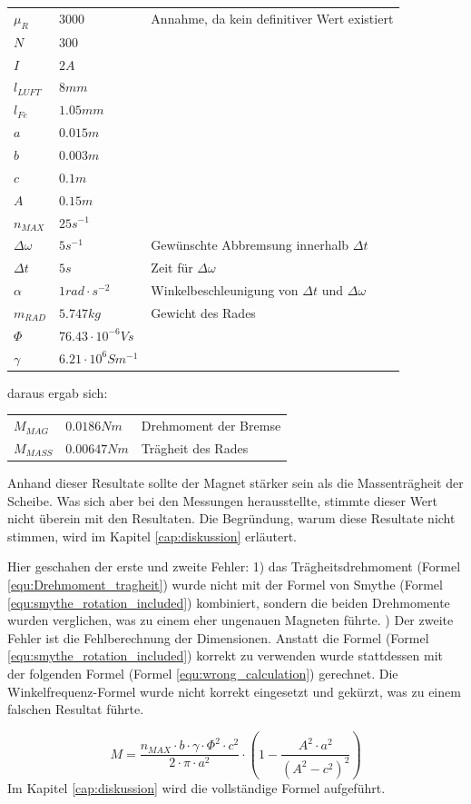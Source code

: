 \begin{tabularx}{0.9\textwidth}{lll}
$\mu_R$	       & $3000$		&Annahme, da kein definitiver Wert existiert\\
$N$	           & $300$		\\
$I$	           & $2 A$\\
$l_{LUFT}$	   & $8 mm$\\
$l_{Fe}$ 	     & $1.05 mm$\\
$a$	           & $0.015 m$\\
$b$	           & $0.003 m$\\
$c$	           & $0.1 m$\\
$A$	           & $0.15 m$\\
$n_{MAX}$	     & $25 s^{-1}$	\\
$\Delta\omega$ & $5 s^{-1}$	  &	Gewünschte Abbremsung innerhalb $\Delta t$\\
$\Delta t$	   & $5 s$        &	Zeit für $\Delta\omega$\\
$\alpha$	     & $1 rad\cdot s^{-2}$&	Winkelbeschleunigung von $\Delta t$ und $\Delta\omega$\\
$m_{RAD}$	     & $5.747 kg$	  & Gewicht des Rades\\
$\Phi$	       & $76.43\cdot 10^{-6} Vs$\\
$\gamma$	     & $6.21\cdot 10^{6} Sm^{-1}$
\end{tabularx}\nonumber
\newpara
daraus ergab sich:
\newpara
\begin{tabularx}{0.9\textwidth}{lll}
  $M_{MAG}$	   & $0.0186 Nm$		& Drehmoment der Bremse\\
  $M_{MASS}$   & $0.00647 Nm$		& Trägheit des Rades\\
\end{tabularx}\nonumber
\newpara
Anhand dieser Resultate sollte der Magnet stärker sein als die Massenträgheit der Scheibe. Was sich aber bei den Messungen herausstellte, stimmte dieser Wert nicht überein mit den Resultaten. Die Begründung, warum diese Resultate nicht stimmen, wird im Kapitel \ref{cap:diskussion} erläutert.
\newpara
\begin{tcolorbox}
  Hier geschahen der erste und zweite Fehler: 1) das Trägheitsdrehmoment (Formel \ref{equ:Drehmoment_tragheit}) wurde nicht mit der Formel von Smythe (Formel \ref{equ:smythe_rotation_included}) kombiniert, sondern die beiden Drehmomente wurden verglichen, was zu einem eher ungenauen Magneten führte. 
  ) Der zweite Fehler ist die Fehlberechnung der Dimensionen. Anstatt die Formel (Formel \ref{equ:smythe_rotation_included}) korrekt zu verwenden wurde stattdessen mit der folgenden Formel (Formel \ref{equ:wrong_calculation}) gerechnet. Die Winkelfrequenz-Formel wurde nicht korrekt eingesetzt und gekürzt, was zu einem falschen Resultat führte.

  \begin{equation}
    \label{equ:wrong_calculation}
    M=\frac{n_{MAX}\cdot b\cdot\gamma\cdot\Phi^2\cdot c^2}{2\cdot\pi\cdot a^2}\cdot(1-\frac{A^{2}\cdot a^{2}}{(A^{2}-c^{2})^{2}})
  \end{equation}
  \newpara
  Im Kapitel \ref{cap:diskussion} wird die vollständige Formel aufgeführt.
\end{tcolorbox}